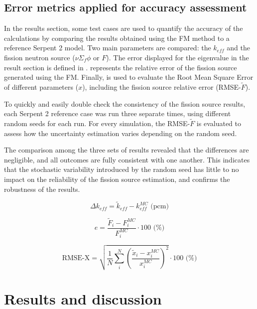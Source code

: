 \documentclass[preprint,review,12pt]{elsarticle}
\begin{document}
\subsection{Error metrics applied for accuracy assessment}

In the results section, some test cases are used to quantify the accuracy of the calculations by comparing the results obtained using the FM method to a reference Serpent 2 model. Two main parameters are compared: the $k_{eff}$ and the fission neutron source ($\nu\Sigma_f\phi$ or $F$). The error displayed for the eigenvalue in the result section is defined in .  represents the relative error of the fission source generated using the FM. Finally,  is used to evaluate the Root Mean Square Error of different parameters ($x$), including the fission source relative error (RMSE-$\tilde{F}$). 

To quickly and easily double check the consistency of the fission source results, each Serpent 2 reference case was run three separate times, using different random seeds for each run. For every simulation, the RMSE-$\tilde{F}$ is evaluated to assess how the uncertainty estimation varies depending on the random seed.

The comparison among the three sets of results revealed that the differences are negligible, and all outcomes are fully consistent with one another. This indicates that the stochastic variability introduced by the random seed has little to no impact on the reliability of the fission source estimation, and confirms the robustness of the results.    

\begin{equation}
    \Delta k_{eff} = \tilde{k}_{eff} - k^{MC}_{eff}  \text{ (pcm)}
\label{eq:keff_err}
\end{equation}


\begin{equation}
    e = \frac{\tilde{F}_i-F_i^{MC}}{F_i^{MC}} \cdot 100 \text{ (\%)}
\label{eq:fission_source_rel_err}
\end{equation}


\begin{equation}
    \text{RMSE-X}  = \sqrt{\frac{1}{N} \sum_i^N \left( \frac{\tilde{x}_i-x_{i}^{MC}}{x^{MC}_{i}} \right)^2 }\cdot 100 \text{ (\%)}
\label{eq:fission_source_RMS_err}
\end{equation}


\section{Results and discussion}
\end{document}
